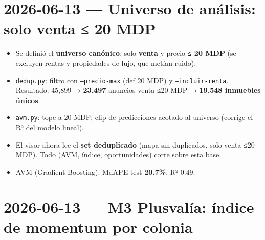 \documentclass[11pt]{article}
\newcommand{\codigo}[1]{\texttt{#1}}
\begin{document}
\section*{2026-06-13 — Universo de análisis: solo venta ≤ 20 MDP}

\begin{itemize}
  \item Se definió el \textbf{universo canónico}: solo \textbf{venta} y precio
        \textbf{≤ 20 MDP} (se excluyen rentas y propiedades de lujo, que metían ruido).
  \item \codigo{dedup.py}: filtro con \codigo{--precio-max} (def 20 MDP) y
        \codigo{--incluir-renta}. Resultado: 45{,}899 → \textbf{23{,}497} anuncios
        venta ≤20 MDP → \textbf{19{,}548 inmuebles únicos}.
  \item \codigo{avm.py}: tope a 20 MDP; clip de predicciones acotado al universo
        (corrige el R² del modelo lineal).
  \item El visor ahora lee el \textbf{set deduplicado} (mapa sin duplicados, solo
        venta ≤20 MDP). Todo (AVM, índice, oportunidades) corre sobre esta base.
  \item AVM (Gradient Boosting): MdAPE test \textbf{20.7\%}, R² 0.49.
\end{itemize}

\section*{2026-06-13 — M3 Plusvalía: índice de momentum por colonia}
\end{document}
